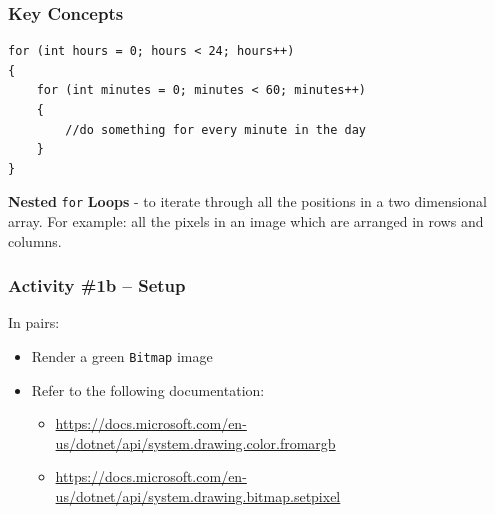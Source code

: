 \begin{frame}[fragile]
	\frametitle{Key Concepts}
	

	
	\begin{lstlisting}
for (int hours = 0; hours < 24; hours++)
{
	for (int minutes = 0; minutes < 60; minutes++)
	{
		//do something for every minute in the day
	}
}
	\end{lstlisting}
		\textbf{Nested} \texttt{for} \textbf{Loops} - to iterate through all the positions in a two dimensional array. For example: all the pixels in an image which are arranged in rows and columns.
	
\end{frame}


\begin{frame}
	\frametitle{Activity \#1b -- Setup}
	
	In pairs:
	
	\vspace{2em}
	
	\begin{itemize}		
		\item Render a green \texttt{Bitmap} image
		\item Refer to the following documentation:
		\begin{itemize}
			\item \url{https://docs.microsoft.com/en-us/dotnet/api/system.drawing.color.fromargb}
			\item \url{https://docs.microsoft.com/en-us/dotnet/api/system.drawing.bitmap.setpixel}
		\end{itemize}
	\end{itemize}
\end{frame}

